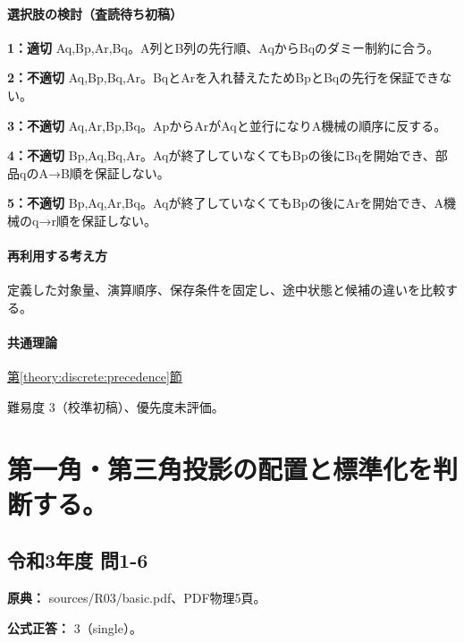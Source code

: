\paragraph{選択肢の検討（査読待ち初稿）}\mbox{}\par

\noindent\textbf{1：適切} Aq,Bp,Ar,Bq。A列とB列の先行順、AqからBqのダミー制約に合う。\par

\noindent\textbf{2：不適切} Aq,Bp,Bq,Ar。BqとArを入れ替えたためBpとBqの先行を保証できない。\par

\noindent\textbf{3：不適切} Aq,Ar,Bp,Bq。ApからArがAqと並行になりA機械の順序に反する。\par

\noindent\textbf{4：不適切} Bp,Aq,Bq,Ar。Aqが終了していなくてもBpの後にBqを開始でき、部品qのA→B順を保証しない。\par

\noindent\textbf{5：不適切} Bp,Aq,Ar,Bq。Aqが終了していなくてもBpの後にArを開始でき、A機械のq→r順を保証しない。\par

\paragraph{再利用する考え方} 定義した対象量、演算順序、保存条件を固定し、途中状態と候補の違いを比較する。

\paragraph{共通理論} \hyperref[theory:discrete:precedence]{第\ref*{theory:discrete:precedence}節}

\par 難易度 3（校準初稿）、優先度未評価。

\section{第一角・第三角投影の配置と標準化を判断する。}

\subsection{令和3年度 問1-6}
\label{q:r03-reg-basic-1-6}

\noindent\textbf{原典：} sources/R03/basic.pdf、PDF物理5頁。

\textbf{公式正答：} 3（single）。

